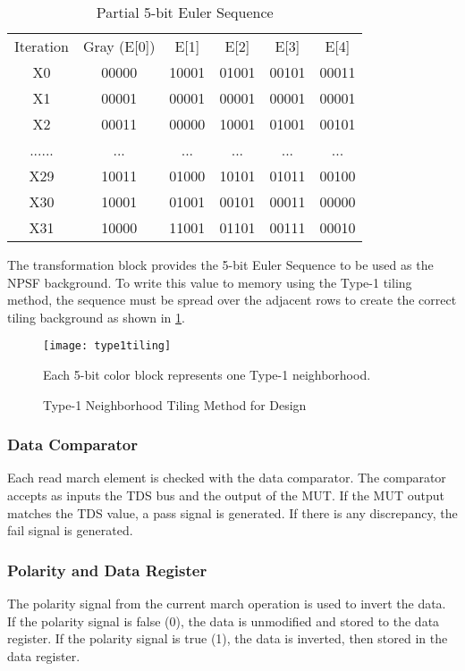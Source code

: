 \begin{table}[h]
  \caption{Partial 5-bit Euler Sequence}
  \centering
  \begin{tabular}{c c c c c c}
  \hline\hline
  Iteration    & Gray (E[0]) & E[1]  & E[2]  & E[3]  & E[4]  \\
  X0  & 00000 & 10001 & 01001 & 00101 & 00011 \\
  X1  & 00001 & 00001 & 00001 & 00001 & 00001 \\
  X2  & 00011 & 00000 & 10001 & 01001 & 00101 \\
  ......             & ...   & ...   & ...   & ...   & ...   \\
  X29 & 10011 & 01000 & 10101 & 01011 & 00100 \\
  X30 & 10001 & 01001 & 00101 & 00011 & 00000 \\
  X31 & 10000 & 11001 & 01101 & 00111 & 00010 \\ [0.5ex]
  \end{tabular}
  \label{tab:euler}
\end{table}

The transformation block provides the 5-bit Euler Sequence to be used as the NPSF background.  To write this value to memory using the Type-1 tiling method, the sequence must be spread over the adjacent rows to create the correct tiling background as shown in \ref{fig:tiling}.  

\begin{figure}[h!]
  \centering
  \texttt{[image: type1tiling]}
  \caption[Type-1 Neighborhood Tiling Method for Design]{Type-1 Neighborhood Tiling Method for Design}  
   Each 5-bit color block represents one Type-1 neighborhood.
  \label{fig:tiling}
\end{figure}

\subsubsection{Data Comparator}
Each read march element is checked with the data comparator.  The comparator accepts as inputs the TDS bus and the output of the MUT.  If the MUT output matches the TDS value, a pass signal is generated.  If there is any discrepancy, the fail signal is generated.  

\subsubsection{Polarity and Data Register}
The polarity signal from the current march operation is used to invert the data.  If the polarity signal is false (0), the data is unmodified and stored to the data register.  If the polarity signal is true (1), the data is inverted, then stored in the data register.  

